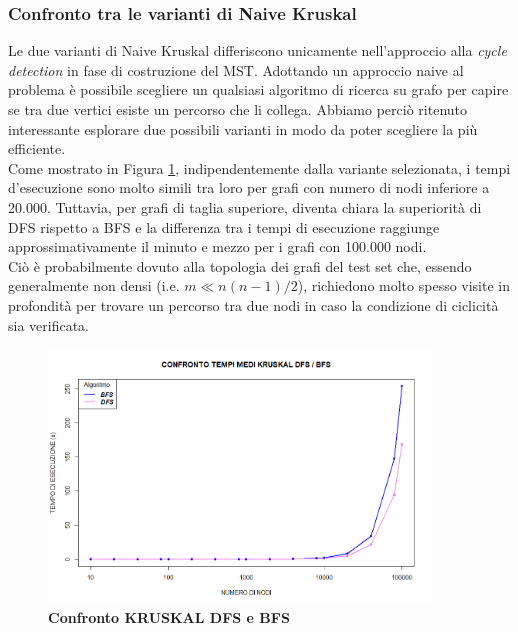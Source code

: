 \documentclass[]{article}
\begin{document}
\begin{flushleft}




\subsubsection{Confronto tra le varianti di Naive Kruskal}
Le due varianti di Naive Kruskal differiscono unicamente nell'approccio alla \textit{cycle detection} in fase di costruzione del MST. Adottando un approccio naive al problema è possibile scegliere un qualsiasi algoritmo di ricerca su grafo per capire se tra due vertici esiste un percorso che li collega. Abbiamo perciò ritenuto interessante esplorare due possibili varianti in modo da poter scegliere la più efficiente.\\
Come mostrato in Figura \ref{dfs-bfs}, indipendentemente dalla variante selezionata, i tempi d'esecuzione sono molto simili tra loro per grafi con numero di nodi inferiore a 20.000. Tuttavia, per grafi di taglia superiore, diventa chiara la superiorità di DFS rispetto a BFS e la differenza tra i tempi di esecuzione raggiunge approssimativamente il minuto e mezzo per i grafi con 100.000 nodi.\\
Ciò è probabilmente dovuto alla topologia dei grafi del test set che, essendo generalmente non densi (i.e. $m \ll n(n-1)/2$), richiedono molto spesso visite in profondità per trovare un percorso tra due nodi in caso la condizione di ciclicità sia verificata.
\begin{figure}[h]
	\centering
	\includegraphics[width=0.9\textwidth,height=\textheight,keepaspectratio]{COMPARE_2.png}
	\caption{\textbf{Confronto KRUSKAL DFS e BFS}}
	\label{dfs-bfs}
\end{figure}

\end{flushleft}
\end{document}
